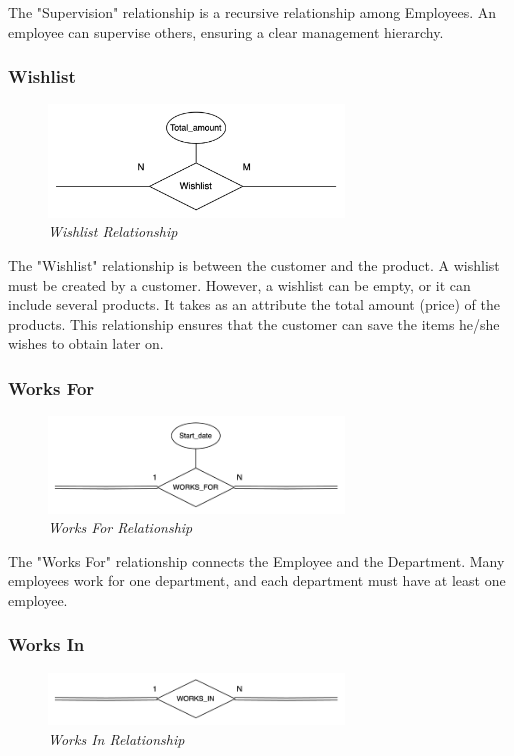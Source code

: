 \documentclass[11pt]{article}
\begin{document}
The "Supervision" relationship is a recursive relationship among Employees. An employee can supervise others, ensuring a clear management hierarchy.

\subsubsection{Wishlist}
\begin{figure}[H]
  \centering
  \includegraphics[width=0.7\textwidth]{images/relationships/wishlist.png}
  \caption{\textit{Wishlist Relationship}}
\end{figure}

The "Wishlist" relationship is between the customer and the product. A wishlist must be created by a customer. However, a wishlist can be empty, or it can include several products. It takes as an attribute the total amount (price) of the products. This relationship ensures that the customer can save the items he/she wishes to obtain later on.

\subsubsection{Works For}
\begin{figure}[H]
  \centering
  \includegraphics[width=0.7\textwidth]{images/relationships/works_for.png}
  \caption{\textit{Works For Relationship}}
\end{figure}

The "Works For" relationship connects the Employee and the Department. Many employees work for one department, and each department must have at least one employee.

\subsubsection{Works In}
\begin{figure}[H]
  \centering
  \includegraphics[width=0.7\textwidth]{images/relationships/works_in.png}
  \caption{\textit{Works In Relationship}}
\end{figure}
\end{document}
